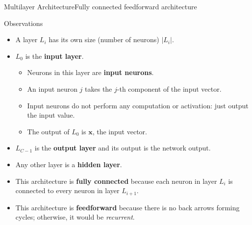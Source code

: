 \documentclass{beamer}
\begin{document}
        \begin{frame}{Multilayer Architecture}{Fully connected feedforward architecture}
            \begin{block}{Observations}
                \begin{itemize}
                    \item A layer $L_i$ has its own size (number of neurons) $|L_i|$.
                    \item $L_0$ is the \textbf{input layer}.
                        \begin{itemize}
                            \item Neurons in this layer are \textbf{input neurons}.
                            \item An input neuron $j$ takes the $j$-th component of the input vector.
                            \item Input neurons do not perform any computation or
                                        activation: just output the input value.
                            \item The output of $L_0$ is $\mathbf{x}$, the input vector.
                        \end{itemize}
                    \item $L_{C-1}$ is the \textbf{output layer} and its output is the
                        network output.
                    \item Any other layer is a \textbf{hidden layer}.
                    \item This architecture is \textbf{fully connected} because each neuron in
                        layer $L_i$ is connected to every neuron in layer $L_{i+1}$.
                    \item This architecture is \textbf{feedforward} because there is no back 
                        arrows forming cycles; otherwise, it would be \emph{recurrent}.
                \end{itemize}
            \end{block}
        \end{frame}
\end{document}
